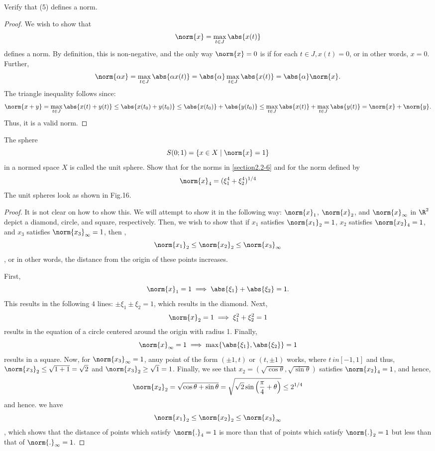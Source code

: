 \begin{question}
    Verify that (5) defines a norm.
    \label{section2.2-9}
\end{question}
\begin{proof}
    We wish to show that 
    \[\norm{x} = \max_{t \in J} \abs{x(t)}\]
    defines a norm. By definition, this is non-negative, and the only way $\norm{x} = 0$ is if for each $t \in J, x(t) = 0$, or in other words, $x = 0$. Further, 
    \[\norm{\alpha x} = \max_{t \in J} \abs{\alpha x(t)} = \abs{\alpha} \max_{t \in J} \abs{x(t)} = \abs{\alpha} \norm{x}.\]
    The triangle inequality follows since:
    \[\norm{x + y} = \max_{t \in J} \abs{x(t) + y(t)} \leq \abs{x(t_0) + y(t_0)} \leq \abs{x(t_0)} + \abs{y(t_0)} \leq \max_{t \in J} \abs{x(t)} + \max_{t \in J} \abs{y(t)} = \norm{x} + \norm{y}.\]
    Thus, it is a valid norm.
\end{proof}

\begin{question}
    The sphere
    \[S(0;1) = \{x \in X \mid \norm{x} = 1\}\]
    in a normed space $X$ is called the unit sphere. Show that for the norms in \ref{section2.2-6} and for the norm defined by 
    \[\norm{x}_4 = (\xi_1^4 + \xi_2^4)^{1/4}\]
    The unit spheres look as shown in Fig.16.
    \label{section2.2-10}
\end{question}
\begin{proof}
    It is not clear on how to show this. We will attempt to show it in the following way: $\norm{x}_1$, $\norm{x}_2$, and $\norm{x}_\infty$ in $\R^2$ depict a diamond, circle, and square, respectively. Then, we wish to show that if $x_1$ satisfies $\norm{x_1}_2 = 1$, $x_2$ satisfies $\norm{x_2}_4 = 1$, and  $x_3$ satisfies $\norm{x_3}_\infty = 1$, then ,
    \[\norm{x_1}_2 \leq \norm{x_2}_2 \leq \norm{x_3}_\infty\],
    or in other words, the distance from the origin of these points increases.

    First, 
    \[\norm{x}_1 = 1 \implies \abs{\xi_1} + \abs{\xi_2} = 1.\]
    This results in the following $4$ lines: $\pm \xi_1 \pm \xi_2 = 1$, which results in the diamond. Next, 
    \[\norm{x}_2 = 1 \implies \xi_1^2 + \xi_2^2 = 1\]
    results in the equation of a circle centered around the origin with radius 1. Finally, 
    \[\norm{x}_\infty = 1 \implies \max\{\abs{\xi_1} , \abs{\xi_2}\} = 1\]
    results in a square.
    Now, for $\norm{x_3}_\infty = 1$, anuy point of the form $(\pm 1  , t)$ or $(t , \pm 1)$ works, where $t \ in [-1,1]$ and thus, $\norm{x_3}_2 \leq \sqrt{1 + 1} = \sqrt{2}$ and $\norm{x_3}_2 \geq \sqrt{1} = 1$. Finally, we see that $x_2 = (\sqrt{\cos \theta} , \sqrt{\sin \theta})$ satisfies $\norm{x_2}_4 = 1$, and hence, 
    \[\norm{x_2}_2 = \sqrt{\cos \theta + \sin \theta} = \sqrt{\sqrt{2} \sin \left(\frac{\pi}{4} + \theta \right)} \leq 2^{1/4}\]
    and hence. we have
    \[\norm{x_1}_2 \leq \norm{x_2}_2 \leq \norm{x_3}_\infty\],
    which shows that the distance of points which satisfy $\norm{.}_4 = 1$ is more than that of points which satisfy $\norm{.}_2 = 1$ but less than that of $\norm{.}_\infty = 1$.
\end{proof}

